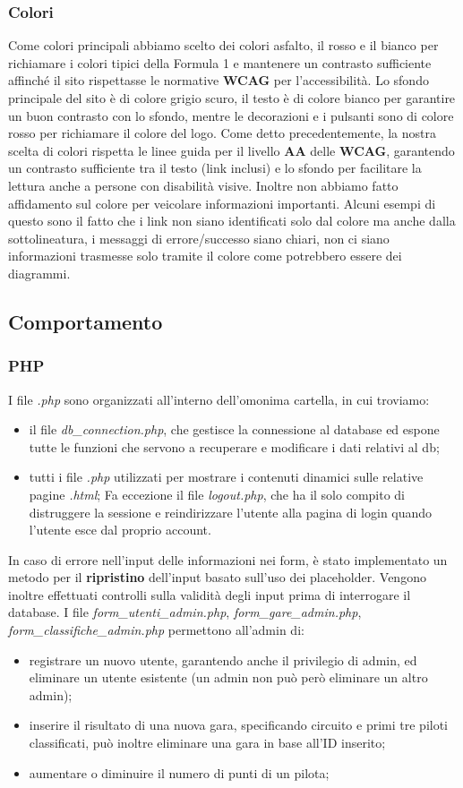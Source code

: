 \documentclass[11pt,a4paper]{article}
\begin{document}
\subsubsection{Colori}
Come colori principali abbiamo scelto dei colori asfalto, il rosso e il bianco per richiamare i colori tipici della Formula 1 e mantenere un contrasto sufficiente affinché il sito rispettasse le normative \textbf{WCAG} per l'accessibilità.
Lo sfondo principale del sito è di colore grigio scuro, il testo è di colore bianco per garantire un buon contrasto con lo sfondo, mentre le decorazioni e i pulsanti sono di colore rosso per richiamare il colore del logo.
Come detto precedentemente, la nostra scelta di colori rispetta le linee guida per il livello \textbf{AA} delle \textbf{WCAG}, garantendo un contrasto sufficiente tra il testo (link inclusi) e lo sfondo per facilitare la lettura anche a persone con disabilità visive.
Inoltre non abbiamo fatto affidamento sul colore per veicolare informazioni importanti. Alcuni esempi di questo sono il fatto che i link non siano identificati solo dal colore ma anche dalla sottolineatura, i messaggi di errore/successo siano chiari, non ci siano informazioni trasmesse solo tramite il colore come potrebbero essere dei diagrammi.
\subsection{Comportamento}
\subsubsection{PHP}
I file \textit{.php} sono organizzati all'interno dell'omonima cartella, in cui troviamo:
\begin{itemize}
    \item il file \textit{db\_connection.php}, che gestisce la connessione al database ed espone tutte le funzioni che servono a recuperare e modificare i dati relativi al db;
    \item tutti i file \textit{.php} utilizzati per mostrare i contenuti dinamici sulle relative pagine \textit{.html}; Fa eccezione il file \textit{logout.php}, che ha il solo compito di distruggere la sessione e reindirizzare l'utente alla pagina di login quando l'utente esce dal proprio account.
\end{itemize}
In caso di errore nell'input delle informazioni nei form, è stato implementato un metodo per il \textbf{ripristino} dell'input basato sull'uso dei placeholder. Vengono inoltre effettuati controlli sulla validità degli input prima di interrogare il database. I file \textit{form\_utenti\_admin.php}, \textit{form\_gare\_admin.php}, \textit{form\_classifiche\_admin.php} permettono all'admin di:
\begin{itemize}
    \item registrare un nuovo utente, garantendo anche il privilegio di admin, ed eliminare un utente esistente (un admin non può però eliminare un altro admin);
    \item inserire il risultato di una nuova gara, specificando circuito e primi tre piloti classificati, può inoltre eliminare una gara in base all'ID inserito;
    \item aumentare o diminuire il numero di punti di un pilota;
\end{itemize}
\end{document}
